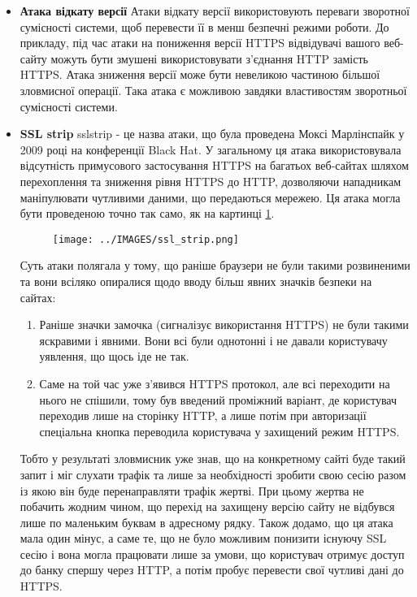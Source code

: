 \begin{itemize}
\item \textbf{Атака відкату версії}
    Атаки відкату версії використовують переваги зворотної сумісності системи, щоб перевести її в менш безпечні режими роботи. До прикладу, під час атаки на пониження версії HTTPS відвідувачі вашого веб-сайту можуть бути змушені використовувати з’єднання HTTP замість HTTPS. Атака зниження версії може бути невеликою частиною більшої зловмисної операції. Така атака є можливою завдяки властивостям зворотньої сумісності системи.
\item \textbf{SSL strip}
    sslstrip - це назва атаки, що була проведена Моксі Марлінспайк у 2009 році на конференції Black Hat. У загальному ця атака використовувала відсутність примусового застосування HTTPS на багатьох веб-сайтах шляхом перехоплення та зниження рівня HTTPS до HTTP, дозволяючи нападникам маніпулювати чутливими даними, що передаються мережею.
    Ця атака могла бути проведеною точно так само, як на картинці \ref{ssl_strip}.
\begin{figure}[ht]
        \centering
        \texttt{[image: ../IMAGES/ssl\_strip.png]}
        \label{ssl_strip}
\end{figure}
    Суть атаки полягала у тому, що раніше браузери не були такими розвиненими та вони всіляко опиралися щодо вводу більш явних значків безпеки на сайтах:
\begin{enumerate}
    \item Раніше значки замочка (сигналізує використання HTTPS) не були такими яскравими і явними. Вони всі були однотонні і не давали користувачу уявлення, що щось іде не так.
    \item Саме на той час уже з'явився HTTPS протокол, але всі переходити на нього не спішили, тому був введений проміжний варіант, де користувач переходив лише на сторінку HTTP, а лише потім при авторизації спеціальна кнопка переводила користувача у захищений режим HTTPS.
\end{enumerate}
    Тобто у результаті зловмисник уже знав, що на конкретному сайті буде такий запит і міг слухати трафік та лише за необхідності зробити свою сесію разом із якою він буде перенаправляти трафік жертві. При цьому жертва не побачить жодним чином, що перехід на захищену версію сайту не відбувся лише по маленьким буквам в адресному рядку.
    Також додамо, що ця атака мала один мінус, а саме те, що не було можливим понизити існуючу SSL сесію і вона могла працювати лише за умови, що користувач отримує доступ до банку спершу через HTTP, а потім пробує перевести свої чутливі дані до HTTPS.

\end{itemize}
